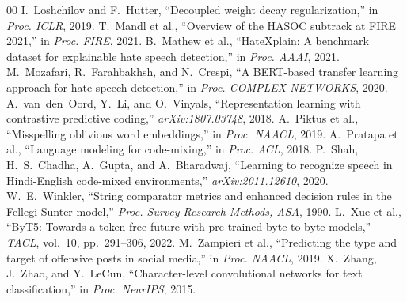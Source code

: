 \documentclass[conference]{IEEEtran}
\begin{document}
\begin{thebibliography}{00}
 I.~Loshchilov and F.~Hutter, ``Decoupled weight decay regularization,'' in \textit{Proc. ICLR}, 2019.
 T.~Mandl et al., ``Overview of the HASOC subtrack at FIRE 2021,'' in \textit{Proc. FIRE}, 2021.
 B.~Mathew et al., ``HateXplain: A benchmark dataset for explainable hate speech detection,'' in \textit{Proc. AAAI}, 2021.
 M.~Mozafari, R.~Farahbakhsh, and N.~Crespi, ``A BERT-based transfer learning approach for hate speech detection,'' in \textit{Proc. COMPLEX NETWORKS}, 2020.
 A.~van~den~Oord, Y.~Li, and O.~Vinyals, ``Representation learning with contrastive predictive coding,'' \textit{arXiv:1807.03748}, 2018.
 A.~Piktus et al., ``Misspelling oblivious word embeddings,'' in \textit{Proc. NAACL}, 2019.
 A.~Pratapa et al., ``Language modeling for code-mixing,'' in \textit{Proc. ACL}, 2018.
 P.~Shah, H.~S.~Chadha, A.~Gupta, and A.~Bharadwaj, ``Learning to recognize speech in Hindi-English code-mixed environments,'' \textit{arXiv:2011.12610}, 2020.
 W.~E.~Winkler, ``String comparator metrics and enhanced decision rules in the Fellegi-Sunter model,'' \textit{Proc. Survey Research Methods, ASA}, 1990.
 L.~Xue et al., ``ByT5: Towards a token-free future with pre-trained byte-to-byte models,'' \textit{TACL}, vol.~10, pp.~291--306, 2022.
 M.~Zampieri et al., ``Predicting the type and target of offensive posts in social media,'' in \textit{Proc. NAACL}, 2019.
 X.~Zhang, J.~Zhao, and Y.~LeCun, ``Character-level convolutional networks for text classification,'' in \textit{Proc. NeurIPS}, 2015.
\end{thebibliography}
\end{document}
